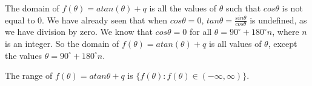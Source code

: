           
          \label{m39414*id91059}The domain of \begin{math}f\left(\theta \right)=atan\left(\theta \right)+q\end{math} is all the values of \begin{math}\theta \end{math} such that \begin{math}cos\theta \end{math} is not equal to 0. We have already seen that when \begin{math}cos\theta =0\end{math}, \begin{math}tan\theta =\frac{sin\theta }{cos\theta }\end{math} is undefined, as we have division by zero. We know that \begin{math}cos\theta =0\end{math} for all \begin{math}\theta ={90}^{\circ }+{180}^{\circ }n\end{math}, where \begin{math}n\end{math} is an integer. So the domain of \begin{math}f\left(\theta \right)=atan\left(\theta \right)+q\end{math} is all values of \begin{math}\theta \end{math}, except the values \begin{math}\theta ={90}^{\circ }+{180}^{\circ }n\end{math}.\par 
          \label{m39414*id91313}The range of \begin{math}f\left(\theta \right)=atan\theta +q\end{math} is \begin{math}\{f\left(\theta \right):f\left(\theta \right)\in \left(-\infty ,\infty \right)\}\end{math}.\par 
        
        \label{m39414*uid88}
            \nopagebreak
            
